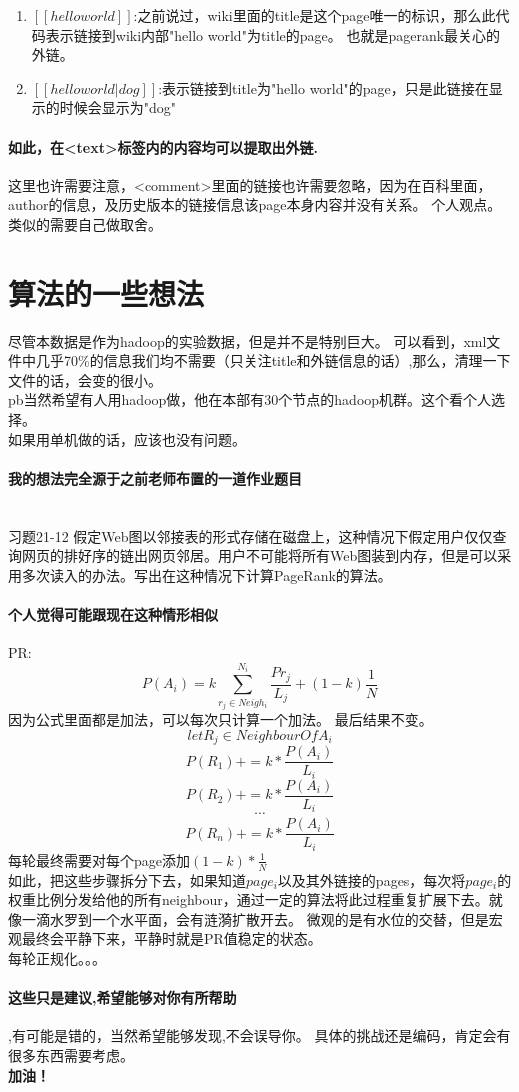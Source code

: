 \documentclass[a4paper]{ctexart}
\begin{document}
\begin{enumerate}
	\item $[[hello world]]$:之前说过，wiki里面的title是这个page唯一的标识，那么此代码表示链接到wiki内部"hello world"为title的page。 也就是pagerank最关心的外链。
	\item $[[hello world|dog]]$:表示链接到title为"hello world"的page，只是此链接在显示的时候会显示为"dog"
\end{enumerate}
\paragraph{如此，在<text>标签内的内容均可以提取出外链.}
这里也许需要注意，<comment>里面的链接也许需要忽略，因为在百科里面，author的信息，及历史版本的链接信息该page本身内容并没有关系。 个人观点。类似的需要自己做取舍。

\section{算法的一些想法}
尽管本数据是作为hadoop的实验数据，但是并不是特别巨大。 可以看到，xml文件中几乎70\%的信息我们均不需要（只关注title和外链信息的话）,那么，清理一下文件的话，会变的很小。\\
pb当然希望有人用hadoop做，他在本部有30个节点的hadoop机群。这个看个人选择。\\
如果用单机做的话，应该也没有问题。\\
\paragraph{我的想法完全源于之前老师布置的一道作业题目}\\
习题21-12 假定Web图以邻接表的形式存储在磁盘上，这种情况下假定用户仅仅查询网页的排好序的链出网页邻居。用户不可能将所有Web图装到内存，但是可以采用多次读入的办法。写出在这种情况下计算PageRank的算法。
\paragraph{个人觉得可能跟现在这种情形相似}
PR:
$$
P(A_i) =k\sum_{r_j \in Neigh_i}^{N_i}{ \frac{P{r_j}}{L_j}} + (1-k)\frac{1}{N}
$$
因为公式里面都是加法，可以每次只计算一个加法。 最后结果不变。 
$$ let R_j \in NeighbourOf A_i $$
$$ P(R_1) += k * \frac{P(A_i)}{L_i} $$
$$ P(R_2) += k * \frac{P(A_i)}{L_i} $$
$$\cdots$$
$$ P(R_n) += k * \frac{P(A_i)}{L_i} $$
每轮最终需要对每个page添加$(1-k) * \frac{1}{N}$\\
如此，把这些步骤拆分下去，如果知道$page_i$以及其外链接的pages，每次将$page_i$的权重比例分发给他的所有neighbour，通过一定的算法将此过程重复扩展下去。就像一滴水罗到一个水平面，会有涟漪扩散开去。 微观的是有水位的交替，但是宏观最终会平静下来，平静时就是PR值稳定的状态。 \\
每轮正规化。。。
\paragraph{这些只是建议,希望能够对你有所帮助},有可能是错的，当然希望能够发现,不会误导你。 具体的挑战还是编码，肯定会有很多东西需要考虑。 \\
\textbf{加油！}
\end{document}
